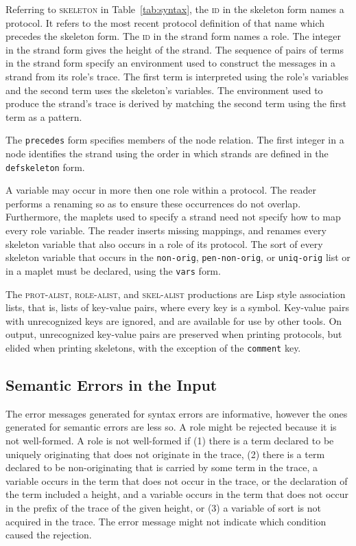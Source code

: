 \documentclass[12pt]{article}
\begin{document}
Referring to \textsc{skeleton} in Table~\ref{tab:syntax}, the
\textsc{id} in the skeleton form names a protocol.  It refers to
the most recent protocol definition of that name which precedes the
skeleton form.  The \textsc{id} in the strand form names a role.
The integer in the strand form gives the height of the strand.  The
sequence of pairs of terms in the strand form specify an environment
used to construct the messages in a strand from its role's trace.  The
first term is interpreted using the role's variables and the second
term uses the skeleton's variables.  The environment used to
produce the strand's trace is derived by matching the second term
using the first term as a pattern.

The \texttt{precedes} form specifies members of the node relation.
The first integer in a node identifies the strand using the order in
which strands are defined in the \texttt{defskeleton} form.

A variable may occur in more then one role within a protocol.  The
reader performs a renaming so as to ensure these occurrences do not
overlap.  Furthermore, the maplets used to specify a strand need not
specify how to map every role variable.  The reader inserts missing
mappings, and renames every skeleton variable that also occurs in a
role of its protocol.  The sort of every skeleton variable that occurs
in the \texttt{non-orig}, \texttt{pen-non-orig}, or \texttt{uniq-orig}
list or in a maplet must be declared, using the \texttt{vars} form.

The \textsc{prot-alist}, \textsc{role-alist}, and \textsc{skel-alist}
productions are Lisp style association lists, that is, lists of
key-value pairs, where every key is a symbol.  Key-value pairs with
unrecognized keys are ignored, and are available for use by other
tools.  On output, unrecognized key-value pairs are preserved when
printing protocols, but elided when printing skeletons, with the
exception of the \texttt{comment} key.

\subsection{Semantic Errors in the Input}\label{sec:semantic errors}

The error messages generated for syntax errors are informative,
however the ones generated for semantic errors are less so.  A role
might be rejected because it is not well-formed.  A role is not well-formed if (1) there is a term
declared to be uniquely originating that does not originate in the
trace, (2) there is a term declared to be non-originating that is
carried by some term in the trace, a variable occurs in the term that
does not occur in the trace, or the declaration of the term included a
height, and a variable occurs in the term that does not occur in the
prefix of the trace of the given height, or (3) a variable of sort
 is not acquired in the trace.  The error message might not
indicate which condition caused the rejection.
\end{document}
